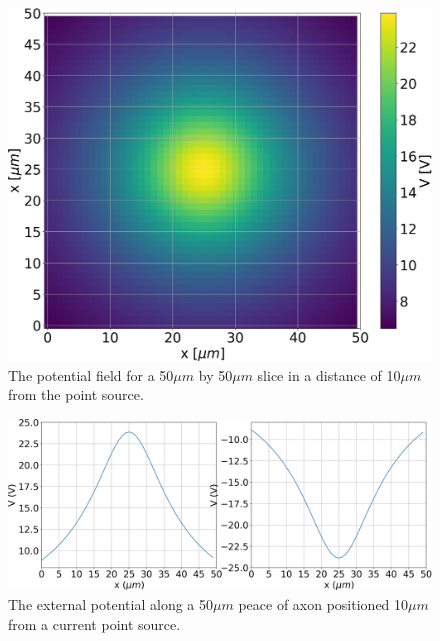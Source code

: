 \documentclass{scrartcl}			%
\begin{document}
\begin{figure}[hbpt!]					%
	\begin{flushleft}
		\centering
		\includegraphics[scale=0.35]{1.png}
		\captionsetup{width=\linewidth}  %
		\caption{The potential field for a 50$\mu m$ by 50$\mu m$ slice in a distance of 10$\mu m$ from the point source.}		
		\label{fig1} %
	\end{flushleft}
\end{figure}

\begin{figure}[hbpt!]					%
	 \begin{flushleft}
		\hspace*{-0.3in}
		\includegraphics[scale=0.4]{2_1.png}
		\captionsetup{width=\linewidth}  %
		\caption{The external potential along a 50$\mu m$ peace of axon positioned 10$\mu m$ from a current point source.}
		\label{fig21} %
	\end{flushleft}
\end{figure}
\end{document}
